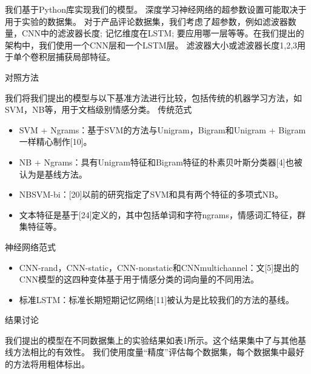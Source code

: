 \documentclass[a4paper,AutoFakeBold,oneside,12pt]{book}
\begin{document}
我们基于Python库实现我们的模型。 深度学习神经网络的超参数设置可能取决于用于实验的数据集。 对于产品评论数据集，我们考虑了超参数，例如滤波器数量，CNN中的滤波器长度; 记忆维度在LSTM; 要应用哪一层等等。在我们提出的架构中，我们使用一个CNN层和一个LSTM层。 滤波器大小或滤波器长度1,2,3用于单个卷积层捕获局部特征。

对照方法


我们将我们提出的模型与以下基准方法进行比较，包括传统的机器学习方法，如SVM，NB等，用于文档级别情感分类。
传统范式

\begin{itemize}
    \item SVM + Ngrams：基于SVM的方法与Unigram，Bigram和Unigram + Bigram一样精心制作[10]。
    \item NB + Ngrams：具有Unigram特征和Bigram特征的朴素贝叶斯分类器[4]也被认为是基线方法。
    \item NBSVM-bi：[20]以前的研究指定了SVM和具有两个特征的多项式NB。
    \item 文本特征是基于[24]定义的，其中包括单词和字符ngrams，情感词汇特征，群集特征等。
\end{itemize}
神经网络范式

\begin{itemize}
    \item CNN-rand，CNN-static，CNN-nonstatic和CNNmultichannel：文[5]提出的CNN模型的这四种变体基于用于情感分类的词向量的不同用法。

    \item 标准LSTM：标准长期短期记忆网络[11]被认为是比较我们的方法的基线。
\end{itemize}

结果讨论

我们提出的模型在不同数据集上的实验结果如表1所示。这个结果集中了与其他基线方法相比的有效性。 我们使用度量“精度”评估每个数据集，每个数据集中最好的方法将用粗体标出。
\end{document}
